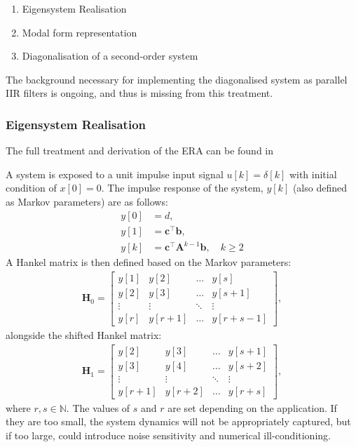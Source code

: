 \begin{enumerate}
    \item Eigensystem Realisation
    \item Modal form representation
    \item Diagonalisation of a second-order system
\end{enumerate}

The background necessary for implementing the diagonalised system as parallel IIR filters is ongoing, and thus is missing from this treatment.

\subsubsection{Eigensystem Realisation}
\label{sec:era-proof}

The full treatment and derivation of the ERA can be found in \cite{juang-1994-book}

A system is exposed to a unit impulse input signal $u[k] = \delta[k]$ with initial condition of $x[0] = 0$. The impulse response of the system, $y[k]$ (also defined as Markov parameters) are as follows:
\begin{subequations}
\label{eq:markov}
\begin{align}
    \label{eq:markov1}
    y[0] &= d,\\
    \label{eq:markov2}
    y[1] &= \mathbf{c}^\top \mathbf{b},\\
    \label{eq:markov3}
    y[k] &= \mathbf{c}^\top \mathbf{A}^{k-1} \mathbf{b}, \quad k \geq 2
\end{align}
\end{subequations}
A Hankel matrix is then defined based on the Markov parameters:
\begin{align}
\label{eq:hankel}
    \mathbf{H}_0 = 
    \begin{bmatrix} 
        y[1] & y[2] & \dots & y[s] \\
        y[2] & y[3] & \dots & y[s+1] \\
        \vdots & \vdots & \ddots & \vdots \\
        y[r] & y[r+1] & \dots & y[r+s-1]
    \end{bmatrix},
\end{align}
alongside the shifted Hankel matrix:
\begin{align}
\label{eq:shift-hankel}
    \mathbf{H}_1 = 
    \begin{bmatrix} 
        y[2] & y[3] & \dots & y[s+1] \\
        y[3] & y[4] & \dots & y[s+2] \\
        \vdots & \vdots & \ddots & \vdots \\
        y[r+1] & y[r+2] & \dots & y[r+s]
    \end{bmatrix},
\end{align}
where $r,s \in \mathbb{N}$. The values of $s$ and $r$ are set depending on the application. If they are too small, the system dynamics will not be appropriately captured, but if too large, could introduce noise sensitivity and numerical ill-conditioning.

